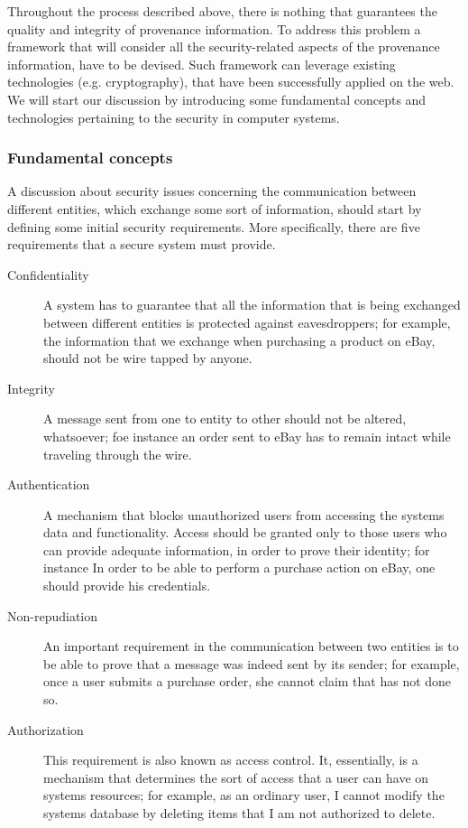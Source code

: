 Throughout the process described above, there is nothing that guarantees the quality and integrity of provenance information. To address this problem a framework that will consider all the security-related aspects of the provenance information, have to be devised. Such framework can leverage existing technologies (e.g. cryptography), that have been successfully applied on the web.
We will start our discussion by introducing some fundamental concepts and technologies pertaining to the security in computer systems.

\subsubsection{Fundamental concepts}

A discussion about security issues concerning the communication between different entities, which exchange some sort of information, should start by defining some initial security requirements. More specifically, there are five requirements that a secure system must provide.

\begin{description}
  \item[Confidentiality]
        A system has to guarantee that all the information that is being exchanged between different entities is protected against eavesdroppers; for example, the information that we exchange when purchasing a product on eBay, should not be wire tapped by anyone.
  \item[Integrity]
        A message sent from one to entity to other should not be altered, whatsoever; foe instance an order sent to eBay has to remain intact while traveling through the wire.
  \item[Authentication]
        A mechanism that blocks unauthorized users from accessing the systems data and functionality. Access should be granted only to those users who can provide adequate information, in order to prove their identity; for instance In order to be able to perform a purchase action on eBay, one should provide his credentials.
  \item[Non-repudiation]
        An important requirement in the communication between two entities is to be able to prove that a message was indeed sent by its sender; for example, once a user submits a purchase order, she cannot claim that has not done so.
  \item[Authorization]
        This requirement is also known as access control. It, essentially, is a mechanism that determines the sort of access that a user can have on systems resources; for example, as an ordinary user, I cannot modify the systems database by deleting items that I am not authorized to delete.
\end{description}


